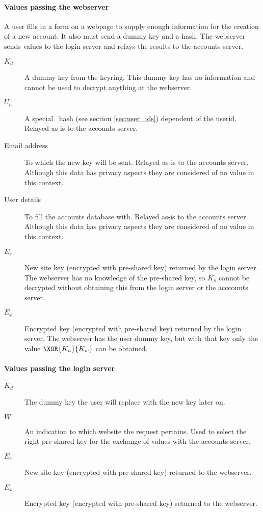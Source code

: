 \paragraph{Values passing the webserver}
A user fills in a form on a webpage to supply enough information for the creation of a new account.
It also must send a dummy key and a hash.
The webserver sends values to the login server and relays the results to the accounts server.
\begin{description}
\item[$K_d$]	A dummy key from the keyring.
	This dummy key has no information and cannot be used to decrypt anything at the webserver.
\item[$U_h$]	A special \SHA\ hash (see section \ref{sec:user_ids}) dependent of the userid.
	Relayed as-is to the accounts server.
\item[Email address]	To which the new key will be sent.
	Relayed as-is to the accounts server.
	Although this data has privacy aspects they are considered of no value in this context.
\item[User details]	To fill the accounts database with.
	Relayed as-is to the accounts server.
	Although this data has privacy aspects they are considered of no value in this context.
\item[$E_s$]	New site key (encrypted with pre-shared key) returned by the login server.
	The webserver has no knowledge of the pre-shared key,
	so $K_s$ cannot be decrypted without obtaining this from the login server or the acccounts server.
\item[$E_x$]	Encrypted key (encrypted with pre-shared key) returned by the login server.
	The webserver has the user dummy key,
	but with that key only the value $\XOR{K_u}{K_w}$ can be obtained.
\end{description}
\paragraph{Values passing the login server}
\begin{description}
\item[$K_d$]	The dummy key the user will replace with the new key later on.
\item[$W$]	An indication to which website the request pertains.
	Used to select the right pre-shared key for the exchange of values with the accounts server.
\item[$E_s$]	New site key (encrypted with pre-shared key) returned to the webserver.
\item[$E_x$]	Encrypted key (encrypted with pre-shared key) returned to the webserver.
\end{description}
